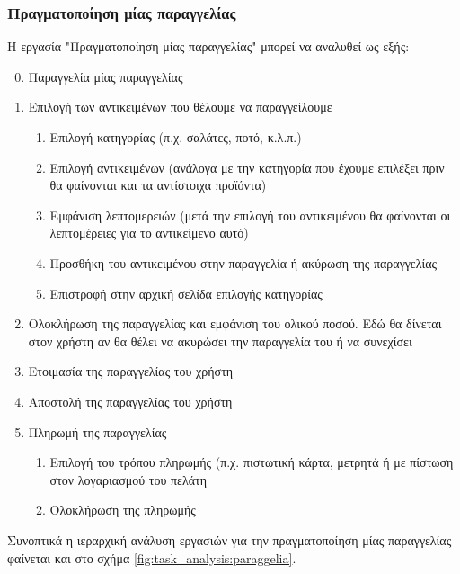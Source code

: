 \documentclass{assignment}
\begin{document}
\subsubsection{Πραγματοποίηση μίας παραγγελίας}

Η εργασία "Πραγματοποίηση μίας παραγγελίας" μπορεί να αναλυθεί ως εξής:

\begin{enumerate}
\setcounter{enumi}{-1}
\item Παραγγελία μίας παραγγελίας
\item Επιλογή των αντικειμένων που θέλουμε να παραγγείλουμε
  \begin{enumerate}[label*=\arabic*.]
  \item Επιλογή κατηγορίας (π.χ. σαλάτες, ποτό, κ.λ.π.)
  \item Επιλογή αντικειμένων (ανάλογα με την κατηγορία που έχουμε επιλέξει πριν θα φαίνονται και τα αντίστοιχα προϊόντα)
  \item Εμφάνιση λεπτομερειών (μετά την επιλογή του αντικειμένου θα φαίνονται οι λεπτομέρειες για το αντικείμενο αυτό)
  \item Προσθήκη του αντικειμένου στην παραγγελία ή ακύρωση της παραγγελίας
  \item Επιστροφή στην αρχική σελίδα επιλογής κατηγορίας
  \end{enumerate}
\item Ολοκλήρωση της παραγγελίας και εμφάνιση του ολικού ποσού. Εδώ θα δίνεται στον χρήστη αν θα θέλει να ακυρώσει την παραγγελία του ή να συνεχίσει
\item Ετοιμασία της παραγγελίας του χρήστη
\item Αποστολή της παραγγελίας του χρήστη
\item Πληρωμή της παραγγελίας
  \begin{enumerate}[label*=\arabic*.]
  \item Επιλογή του τρόπου πληρωμής (π.χ. πιστωτική κάρτα, μετρητά ή με πίστωση στον λογαριασμού του πελάτη
  \item Ολοκλήρωση της πληρωμής
  \end{enumerate}
\end{enumerate}

Συνοπτικά η ιεραρχική ανάλυση εργασιών για την πραγματοποίηση μίας παραγγελίας φαίνεται και στο σχήμα \ref{fig:task_analysis:paraggelia}.
\end{document}
